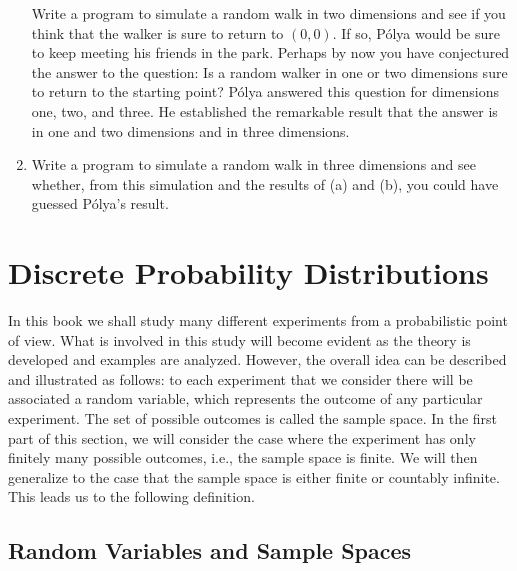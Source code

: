 \begin{LJSItem}
\begin{enumerate}
Write a program to simulate a random walk in two dimensions and see if you
think that the walker is sure to return to $(0,0)$.  If so, P\'olya would be
sure
to keep meeting his friends in the park.  Perhaps by now you have conjectured 
the answer to the question: Is a random walker in one or two dimensions sure
to
return to the starting point?  P\'olya answered this question for dimensions
one, two, and three.  He established the remarkable result that the answer is
 in one and two dimensions and  in three dimensions.

\item Write a program to simulate a random walk in three dimensions and see
whether, from this simulation and the results of (a) and (b), 
you could have guessed P\'olya's result.  
\end{enumerate}

\end{LJSItem}

\section{Discrete Probability Distributions}\label{sec 1.2}  

In this book we shall study many different experiments from a probabilistic
point of view.  What is involved in this study will become evident as the
theory is developed and examples are analyzed.  However, the overall idea can
be described and illustrated as follows: to each experiment that we consider
there will be associated a random variable, which represents the outcome of
any particular experiment.  The set of possible outcomes is called the \emx
{sample space}.  In the first part of  this section, we will consider the
case  where the experiment has only finitely many possible outcomes, i.e., the sample space is
finite.  We will then generalize to the case that the  sample space is either finite or
countably infinite.  This leads us to the following definition.

\subsection*{Random Variables and Sample Spaces}

